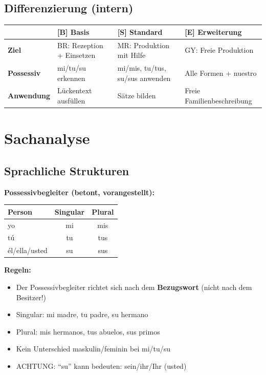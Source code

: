 \documentclass[11pt,a4paper]{article}
\newcommand{\B}{\textcolor{basis}{\textbf{[B]}}}
\newcommand{\Std}{\textcolor{standard}{\textbf{[S]}}}
\newcommand{\E}{\textcolor{erweiterung}{\textbf{[E]}}}
\begin{document}
\subsection{Differenzierung (intern)}
\begin{tabular}{|l|p{3.5cm}|p{3.5cm}|p{3.5cm}|}
\hline
& \B{} \textbf{Basis} & \Std{} \textbf{Standard} & \E{} \textbf{Erweiterung} \\
\hline
\textbf{Ziel} & BR: Rezeption + Einsetzen & MR: Produktion mit Hilfe & GY: Freie Produktion \\
\hline
\textbf{Possessiv} & mi/tu/su erkennen & mi/mis, tu/tus, su/sus anwenden & Alle Formen + nuestro \\
\hline
\textbf{Anwendung} & Lückentext ausfüllen & Sätze bilden & Freie Familien\-beschreibung \\
\hline
\end{tabular}

\section{Sachanalyse}

\subsection{Sprachliche Strukturen}

\textbf{Possessivbegleiter (betont, vorangestellt):}
\begin{center}
\begin{tabular}{|l|c|c|}
\hline
\textbf{Person} & \textbf{Singular} & \textbf{Plural} \\
\hline
yo & mi & mis \\
\hline
tú & tu & tus \\
\hline
él/ella/usted & su & sus \\
\hline
\end{tabular}
\end{center}

\textbf{Regeln:}
\begin{itemize}
    \item Der Possessivbegleiter richtet sich nach dem \textbf{Bezugswort} (nicht nach dem Besitzer!)
    \item Singular: mi madre, tu padre, su hermano
    \item Plural: mis hermanos, tus abuelos, sus primos
    \item Kein Unterschied maskulin/feminin bei mi/tu/su
    \item ACHTUNG: ``su'' kann bedeuten: sein/ihr/Ihr (usted)
\end{itemize}
\end{document}
